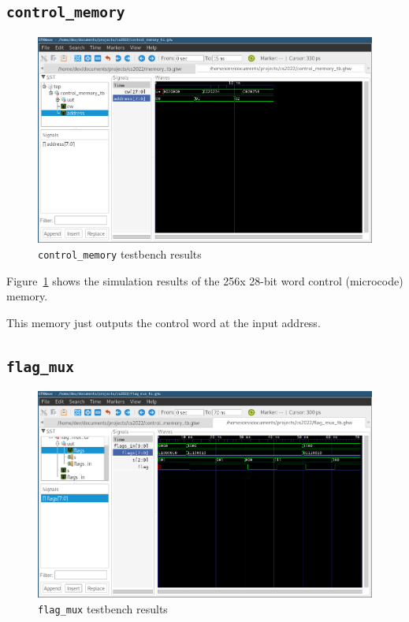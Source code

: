 \documentclass[a4paper]{article}
\numberwithin{figure}{section}
\numberwithin{table}{section}
\newcommand{\mi}{\mintinline}
\begin{document}
\newpage
\subsection{\mi{c}{control_memory}}
\begin{figure}[h!]
	\centering
	\includegraphics[width=\textwidth]{control_memory_tb}
	\caption{\mi{c}{control_memory} testbench results}
	\label{fig:cmemory}
\end{figure}

Figure~\ref{fig:cmemory} shows the simulation results of the 256x 28-bit word control (microcode) memory.

This memory just outputs the control word at the input address.

\newpage
\subsection{\mi{c}{flag_mux}}
\begin{figure}[h!]
	\centering
	\includegraphics[width=\textwidth]{flag_mux_tb}
	\caption{\mi{c}{flag_mux} testbench results}
	\label{fig:fmux}
\end{figure}
\end{document}
